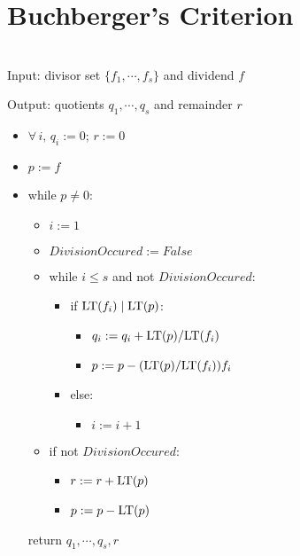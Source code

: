 \chapter{Buchberger's Criterion}

\begin{definition}
    \label{def:MvDivisionAlgorithm}
    ~\\

    Input: divisor set \(\{f_1, \cdots, f_s\}\) and dividend \(f\)

    Output: quotients \(q_1, \cdots, q_s\) and remainder \(r\)

    \begin{itemize}
        \item[] \(\forall\,i,\,q_i := 0;\, r := 0\)
        \item[] \(p := f\)
        \item[] while \(p \ne 0\):
            \begin{itemize}
                \item[] \(i := 1\)
                \item[] \(DivisionOccured := False\)
                \item[] while \(i \le s\) and not \(DivisionOccured\):
                    \begin{itemize}
                        \item[] if \(\mathrm{LT}(f_i) \mid \mathrm{LT}(p)\):
                            \begin{itemize}
                                \item[] \(q_i := q_i + \mathrm{LT}(p) / \mathrm{LT}(f_i)\)
                                \item[] \(p := p - (\mathrm{LT}(p) / \mathrm{LT}(f_i))f_i\)
                            \end{itemize}
                        \item[] else:
                            \begin{itemize}
                                \item[] \(i := i + 1\)
                            \end{itemize}
                    \end{itemize}
                \item[] if not \(DivisionOccured\):
                    \begin{itemize}
                        \item[] \(r := r + \mathrm{LT}(p)\)
                        \item[] \(p := p - \mathrm{LT}(p)\)
                    \end{itemize}
            \end{itemize}
        return \(q_1, \cdots, q_s, r\)
    \end{itemize}

\end{definition}

